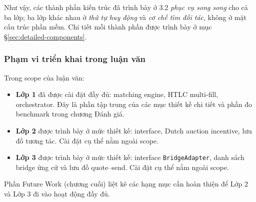 Như vậy, các thành phần kiến trúc đã trình bày ở 3.2 \emph{phục vụ
song song} cho cả ba lớp; ba lớp khác nhau ở \emph{thứ tự huy động}
và \emph{cơ chế tìm đối tác}, không ở mặt cấu trúc phần mềm. Chi
tiết mỗi thành phần được trình bày ở mục
\S\ref{sec:detailed-components}.

\subsubsection*{Phạm vi triển khai trong luận văn}

Trong scope của luận văn:

\begin{itemize}
  \item \textbf{Lớp 1} đã được cài đặt đầy đủ: matching engine, HTLC
    multi-fill, orchestrator. Đây là phần tập
    trung của các mục thiết kế chi tiết và phần đo benchmark trong
    chương Đánh giá.
  \item \textbf{Lớp 2} được trình bày ở mức thiết kế: interface,
    Dutch auction incentive, lưu đồ tương tác. Cài đặt cụ thể
    nằm ngoài scope.
  \item \textbf{Lớp 3} được trình bày ở mức thiết kế: interface
    \texttt{BridgeAdapter}, danh sách bridge ứng cử và lưu đồ
    quote–send. Cài đặt cụ thể nằm ngoài scope.
\end{itemize}

Phần Future Work (chương cuối) liệt kê các hạng mục cần hoàn thiện
để Lớp 2 và Lớp 3 đi vào hoạt động đầy đủ.
